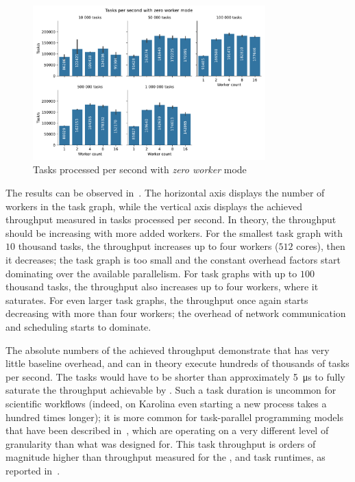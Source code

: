 \begin{figure}[h]
	\centering
	\includegraphics[width=0.8\textwidth]{imgs/hq/charts/task-per-s}
	\caption{Tasks processed per second with \emph{zero worker} mode}
	\label{fig:hq-tasks-per-s}
\end{figure}

The results can be observed in~. The horizontal axis displays the number of
workers in the task graph, while the vertical axis displays the achieved throughput measured in
tasks processed per second. In theory, the throughput should be increasing with more added workers. For
the smallest task graph with $10$ thousand tasks, the throughput increases up to
four workers ($512$ cores), then it decreases; the task graph is too small and the
constant overhead factors start dominating over the available parallelism. For task graphs with up
to $100$ thousand tasks, the throughput also increases up to four workers, where it
saturates. For even larger task graphs, the throughput once again starts decreasing with more than
four workers; the overhead of network communication and scheduling starts to dominate.

The absolute numbers of the achieved throughput demonstrate that \hyperqueue{} has very
little baseline overhead, and can in theory execute hundreds of thousands of tasks per second. The
tasks would have to be shorter than approximately \SI{5}{\micro\second} to fully saturate the
throughput achievable by \hyperqueue{}. Such a task duration is uncommon for scientific
workflows (indeed, on Karolina even starting a new process takes a hundred times longer); it is
more common for task-parallel programming models that have been described
in~, which are operating on a very different level of granularity than what
\hyperqueue{} was designed for. This task throughput is orders of magnitude higher than
throughput measured for the \parsl{}, \fireworks{} and
\dask{} task runtimes, as reported in~\cite{parsl}.

